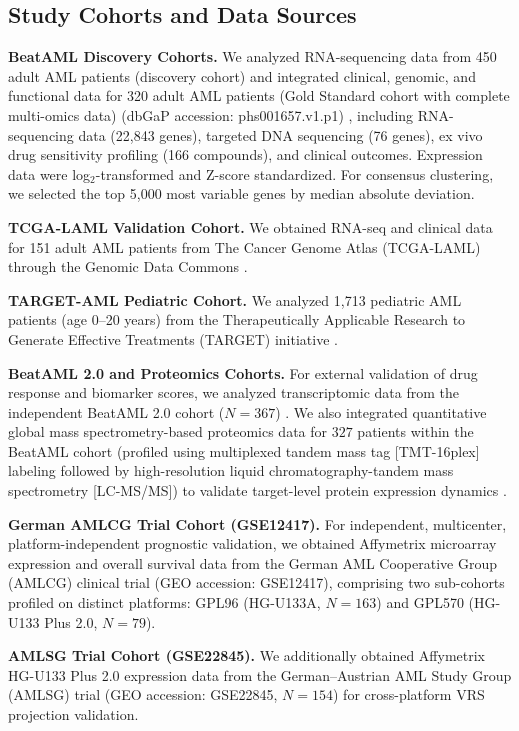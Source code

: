\documentclass[11pt,a4paper]{article}
\begin{document}
\subsection{Study Cohorts and Data Sources}

\textbf{BeatAML Discovery Cohorts.} We analyzed RNA-sequencing data from 450 adult AML patients (discovery cohort) and integrated clinical, genomic, and functional data for 320 adult AML patients (Gold Standard cohort with complete multi-omics data) (dbGaP accession: phs001657\allowbreak.v1\allowbreak.p1) \cite{tyner2018beataml}, including RNA-sequencing data (22,843 genes), targeted DNA sequencing (76 genes), ex vivo drug sensitivity profiling (166 compounds), and clinical outcomes. Expression data were log$_2$-transformed and Z-score standardized. For consensus clustering, we selected the top 5,000 most variable genes by median absolute deviation.

\textbf{TCGA-LAML Validation Cohort.} We obtained RNA-seq and clinical data for 151 adult AML patients from The Cancer Genome Atlas (TCGA-LAML) through the Genomic Data Commons \cite{cancer2013tcga}.

\textbf{TARGET-AML Pediatric Cohort.} We analyzed 1,713 pediatric AML patients (age 0--20 years) from the Therapeutically Applicable Research to Generate Effective Treatments (TARGET) initiative \cite{bolouri2018target}.

\textbf{BeatAML 2.0 and Proteomics Cohorts.} For external validation of drug response and biomarker scores, we analyzed transcriptomic data from the independent BeatAML 2.0 cohort ($N=367$) \cite{bottomly2022}. We also integrated quantitative global mass spectrometry-based proteomics data for $327$ patients within the BeatAML cohort (profiled using multiplexed tandem mass tag [TMT-16plex] labeling followed by high-resolution liquid chromatography-tandem mass spectrometry [LC-MS/MS]) to validate target-level protein expression dynamics \cite{pino2024mapping}.

\textbf{German AMLCG Trial Cohort (GSE12417).} For independent, multicenter, platform-independent prognostic validation, we obtained Affymetrix microarray expression and overall survival data from the German AML Cooperative Group (AMLCG) clinical trial (GEO accession: GSE12417), comprising two sub-cohorts profiled on distinct platforms: GPL96 (HG-U133A, $N=163$) and GPL570 (HG-U133 Plus 2.0, $N=79$).

\textbf{AMLSG Trial Cohort (GSE22845).} We additionally obtained Affymetrix HG-U133 Plus 2.0 expression data from the German--Austrian AML Study Group (AMLSG) trial (GEO accession: GSE22845, $N=154$) for cross-platform VRS projection validation.
\end{document}
